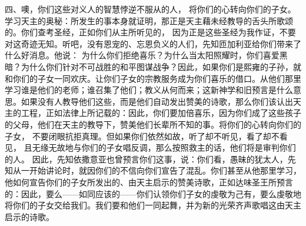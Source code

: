 四、噢，你们这些对义人的智慧悖逆不服从的人， 将你们的心转向你们的子女。学习天主的奥秘：所发生的事本身就证明，那正是天主藉未经教导的舌头所歌颂的。你们查考圣经，正如你们从主所听见的， 因为正是这些圣经为我作证，不要对这奇迹无知。听吧，没有恩宠的、忘恩负义的人们，先知匝加利亚给你们带来了什么好消息。他说： 为什么你们拒绝喜乐？为什么当太阳照耀时，你们喜爱黑暗？为什么你们针对不可战胜的和平图谋战争？因此，如果你们是熙雍的子孙，就和你们的子女一同欢庆。让你们子女的宗教服务成为你们喜乐的借口。从他们那里学习谁是他们的老师；谁召集了他们；教义从何而来；这新神学和旧预言是什么意思。如果没有人教导他们这些，而是他们自动发出赞美的诗歌，那么你们该认出天主的工程，正如法律上所记载的：因此，你们要加倍喜乐，因为你们成了这些孩子的父母，他们在天主的教导下，赞美他们长辈所不知的事。将你们的心转向你们的子女， 不要闭眼抗拒真理。但如果你们依然如故，听了却不听见，看了却不看见， 且无缘无故地与你们的子女唱反调，那么按照救主的话，他们将是审判你们的人。 因此，先知依撒意亚也曾预言你们这事，说：你们看，愚昧的犹太人，先知从一开始讲论时，就因你们的不信向你们宣告了混乱。你们甚至从他那里学习，他如何宣告你们的子女所发出的、由天主启示的赞美诗歌，正如达味圣王所预言的：因此，要么——如同应该的——你们认领你们子女的虔敬为己有，要么虔敬地将你们的子女交给我们。我们要和他们一同起舞，并为新的光荣齐声歌唱这由天主启示的诗歌。\par

